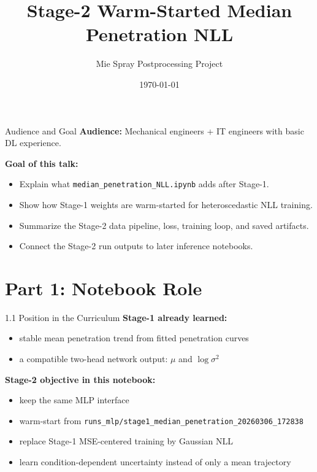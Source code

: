 \documentclass[UTF8,aspectratio=169]{ctexbeamer}
\title{Stage-2 Warm-Started Median Penetration NLL}
\author{Mie Spray Postprocessing Project}
\date{\today}
\begin{document}
\begin{frame}
  \titlepage
\end{frame}

\begin{frame}{Audience and Goal}
\textbf{Audience:} Mechanical engineers + IT engineers with basic DL experience.

\vspace{0.5em}
\textbf{Goal of this talk:}
\begin{itemize}
  \item Explain what \texttt{median\_penetration\_NLL.ipynb} adds after Stage-1.
  \item Show how Stage-1 weights are warm-started for heteroscedastic NLL training.
  \item Summarize the Stage-2 data pipeline, loss, training loop, and saved artifacts.
  \item Connect the Stage-2 run outputs to later inference notebooks.
\end{itemize}
\end{frame}

\section{Part 1: Notebook Role}

\begin{frame}{1.1 Position in the Curriculum}
\textbf{Stage-1 already learned:}
\begin{itemize}
  \item stable mean penetration trend from fitted penetration curves
  \item a compatible two-head network output: $\mu$ and $\log \sigma^2$
\end{itemize}

\vspace{0.4em}
\textbf{Stage-2 objective in this notebook:}
\begin{itemize}
  \item keep the same MLP interface
  \item warm-start from \texttt{runs\_mlp/stage1\_median\_penetration\_20260306\_172838}
  \item replace Stage-1 MSE-centered training by Gaussian NLL
  \item learn condition-dependent uncertainty instead of only a mean trajectory
\end{itemize}
\end{frame}
\end{document}
